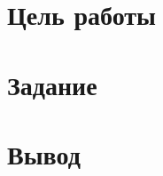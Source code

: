

\def \labnum {5}
\def \labsubj {Организация ЭВМ и систем}
\def \labauthor {Айтуганов Д. А. \\ Чебыкин И. Б.}
\def \labgroup {P3301}
\def \labinsp {Скорубский В. И.}
\def \labname {}

\isnametrue
\lstset{
	caption=\lstname,
	basicstyle=\ttfamily\selectfont\scriptsize
}


\section{Цель работы}
\section{Задание}
\section{Вывод}

